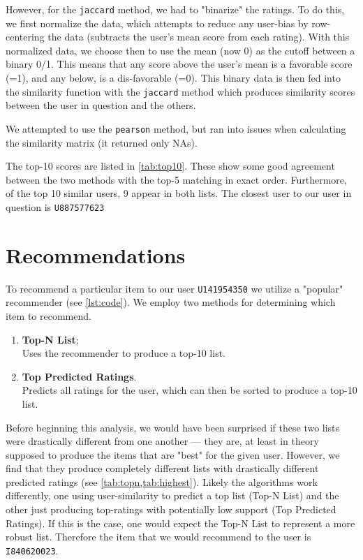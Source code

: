 However, for the \texttt{jaccard} method, we had to "binarize" the ratings.  To do this, we first normalize the data, which attempts to reduce any user-bias by row-centering the data (subtracts the user's mean score from each rating).  With this normalized data, we choose then to use the mean (now 0) as the cutoff between a binary 0/1.  This means that any score above the user's mean is a favorable score (=1), and any below, is a dis-favorable (=0).  This binary data is then fed into the similarity function with the \texttt{jaccard} method which produces similarity scores between the user in question and the others.

We attempted to use the \texttt{pearson} method, but ran into issues when calculating the similarity matrix (it returned only NAs).

The top-10 scores are listed in \cref{tab:top10}.  These show some good agreement between the two methods with the top-5 matching in exact order.  Furthermore, of the top 10 similar users, 9 appear in both lists.  The closest user to our user in question is \texttt{U887577623}



\section{Recommendations}

To recommend a particular item to our user \texttt{U141954350} we utilize a "popular" recommender (see \vref{lst:code}).  We employ two methods for determining which item to recommend.
\begin{enumerate}
\item \textbf{Top-N List};\\Uses the recommender to produce a top-10 list.
\item \textbf{Top Predicted Ratings}.\\Predicts all ratings for the user, which can then be sorted to produce a top-10 list.
\end{enumerate}

Before beginning this analysis, we would have been surprised if these two lists were drastically different from one another --- they are, at least in theory supposed to produce the items that are "best" for the given user.  However, we find that they produce completely different lists with drastically different predicted ratings (see \cref{tab:topn,tab:highest}).  Likely the algorithms work differently, one using user-similarity to predict a top list (Top-N List) and the other just producing top-ratings with potentially low support (Top Predicted Ratings).  If this is the case, one would expect the Top-N List to represent a more robust list.  Therefore the item that we would recommend to the user is \texttt{I840620023}.

